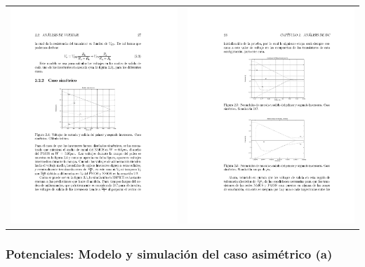 \documentclass[
paper=128mm:96mm, %
fontsize=11pt, %
pagesize, %
parskip=half-, %
]{scrartcl} %
\theoremstyle{mythmstyle} %
\begin{document}
\begin{table}[ht]
\centering
\begin{tabular}{cc}
\includegraphics[width=0.45\linewidth]{modelSimetrico}&\includegraphics[width=0.45\linewidth]{SimSimetrico}\\

\end{tabular}
\label{tab:simetrico}
\end{table}

\clearpage

\subsubsection{Potenciales: Modelo y simulación del caso asimétrico (a)}
\label{sec:asimetricoA}
\end{document}
